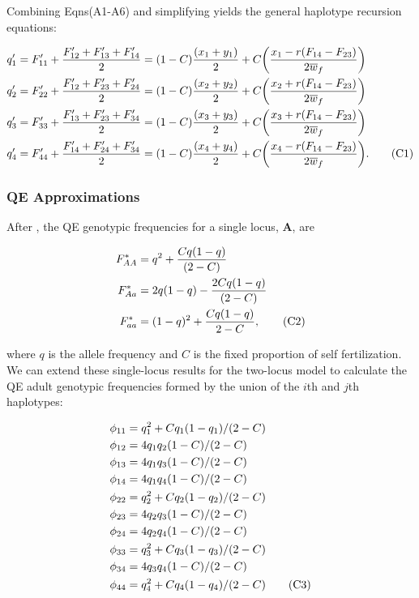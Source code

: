 \documentclass{article}
\newcommand\numberthis{\addtocounter{equation}{1}\tag{\theequation}}
\begin{document}
Combining Eqns(A1-A6) and simplifying yields the general haplotype recursion equations: 

\begin{align*} \label{eq:hapRec}
	q'_1 &= F'_{11} + \frac{F'_{12} + F'_{13} + F'_{14}}{2} = (1 - C) \frac{(x_1 + y_1)}{2} + C \bigg( \frac{x_1 - r(F_{14} - F_{23})}{2 \overline{w}_f} \bigg) \\
	q'_2 &= F'_{22} + \frac{F'_{12} + F'_{23} + F'_{24}}{2} = (1 - C) \frac{(x_2 + y_2)}{2} + C \bigg( \frac{x_2 + r(F_{14} - F_{23})}{2 \overline{w}_f} \bigg) \\
	q'_3 &= F'_{33} + \frac{F'_{13} + F'_{23} + F'_{34}}{2} = (1 - C) \frac{(x_3 + y_3)}{2} + C \bigg( \frac{x_3 + r(F_{14} - F_{23})}{2 \overline{w}_f} \bigg) \\
	q'_4 &= F'_{44} + \frac{F'_{14} + F'_{24} + F'_{34}}{2} = (1 - C) \frac{(x_4 + y_4)}{2} + C \bigg( \frac{x_4 - r(F_{14} - F_{23})}{2 \overline{w}_f} \bigg). \numberthis
\end{align*}


\subsubsection*{QE Approximations}

After \citet{CaballeroHill1992}, the QE genotypic frequencies for a single locus, $\mathbf{A}$, are

\begin{align*}
	F_{AA}^* &= q^2 + \frac{C q(1 - q)}{(2 - C)} \\
	F_{Aa}^* &= 2 q (1 - q) - \frac{2 C q(1 - q)}{(2 - C)} \\
	F_{aa}^* &= (1 - q)^2 + \frac{C q(1 - q)}{2 - C}, \numberthis 
\end{align*}

\noindent{} where $q$ is the allele frequency and $C$ is the fixed proportion of self fertilization. We can extend these single-locus results for the two-locus model to calculate the QE adult genotypic frequencies formed by the union of the $i$th and $j$th haplotypes:

\begin{align*}
	\phi_{11} &= q_1^2 + C q_1 (1 - q_1) / (2-C)  \\
	\phi_{12} &= 4 q_1 q_2 (1 - C) / (2-C)        \\
	\phi_{13} &= 4 q_1 q_3 (1 - C) / (2-C)        \\
	\phi_{14} &= 4 q_1 q_4 (1 - C) / (2-C)        \\
	\phi_{22} &= q_2^2 + C q_2 (1 - q_2) / (2-C)  \\
	\phi_{23} &= 4 q_2 q_3 (1 - C) / (2-C)        \\
	\phi_{24} &= 4 q_2 q_4 (1 - C) / (2-C)        \\
	\phi_{33} &= q_3^2 + C q_3 (1 - q_3) / (2-C)  \\
	\phi_{34} &= 4 q_3 q_4 (1 - C) / (2-C)        \\
	\phi_{44} &= q_4^2 + C q_4 (1 - q_4) / (2-C)  \numberthis
\end{align*}
\end{document}
